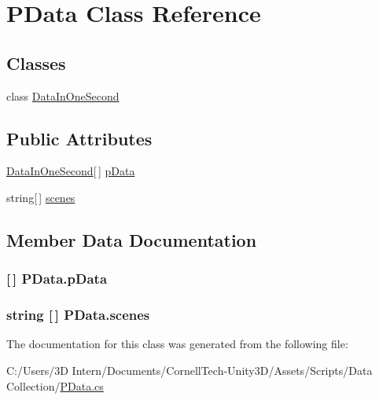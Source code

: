 \hypertarget{class_p_data}{}\section{P\+Data Class Reference}
\label{class_p_data}
\subsection*{Classes}
\begin{DoxyCompactItemize}
\item 
class \hyperlink{class_p_data_1_1_data_in_one_second}{Data\+In\+One\+Second}
\end{DoxyCompactItemize}
\subsection*{Public Attributes}
\begin{DoxyCompactItemize}
\item 
\hyperlink{class_p_data_1_1_data_in_one_second}{Data\+In\+One\+Second}\mbox{[}$\,$\mbox{]} \hyperlink{class_p_data_a725d04f0986eba2e3e87753a025d5afe}{p\+Data}
\item 
string\mbox{[}$\,$\mbox{]} \hyperlink{class_p_data_a242e8983aa217ba08bcfb9d92696cfbb}{scenes}
\end{DoxyCompactItemize}


\subsection{Member Data Documentation}
\subsubsection[{\texorpdfstring{p\+Data}{pData}}]{ \mbox{[}$\,$\mbox{]} P\+Data.\+p\+Data}\hypertarget{class_p_data_a725d04f0986eba2e3e87753a025d5afe}{}\label{class_p_data_a725d04f0986eba2e3e87753a025d5afe}
\subsubsection[{\texorpdfstring{scenes}{scenes}}]{\setlength{\rightskip}{0pt plus 5cm}string \mbox{[}$\,$\mbox{]} P\+Data.\+scenes}\hypertarget{class_p_data_a242e8983aa217ba08bcfb9d92696cfbb}{}\label{class_p_data_a242e8983aa217ba08bcfb9d92696cfbb}


The documentation for this class was generated from the following file\+:\begin{DoxyCompactItemize}
\item 
C\+:/\+Users/3\+D Intern/\+Documents/\+Cornell\+Tech-\/\+Unity3\+D/\+Assets/\+Scripts/\+Data Collection/\hyperlink{_p_data_8cs}{P\+Data.\+cs}\end{DoxyCompactItemize}
